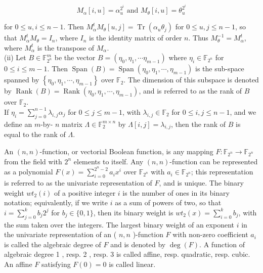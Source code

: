 \documentclass[10pt]{article}
\begin{document}
\begin{equation*}
M_{\alpha}[i, u]=\alpha_{u}^{2^{i}} \text { and } M_{\theta}[i, u]=\theta_{u}^{2^{i}} \tag{1}
\end{equation*}


for $0 \leq u, i \leq n-1$. Then $M_{\alpha}^{t} M_{\theta}[u, j]=\operatorname{Tr}\left(\alpha_{u} \theta_{j}\right)$ for $0 \leq u, j \leq n-1$, so that $M_{\alpha}^{t} M_{\theta}=I_{n}$, where $I_{n}$ is the identity matrix of order $n$. Thus $M_{\theta}^{-1}=M_{\alpha}^{t}$, where $M_{\alpha}^{t}$ is the transpose of $M_{\alpha}$.\\
(ii) Let $B \in \mathbb{F}_{2^{n}}^{m}$ be the vector $B=\left(\eta_{0}, \eta_{1}, \cdots \eta_{m-1}\right)$ where $\eta_{i} \in \mathbb{F}_{2^{n}}$ for $0 \leq i \leq m-1$. Then $\operatorname{Span}(B)=\operatorname{Span}\left(\eta_{0}, \eta_{1}, \cdots, \eta_{m-1}\right)$ is the sub-space spanned by $\left\{\eta_{0}, \eta_{1}, \cdots, \eta_{m-1}\right\}$ over $\mathbb{F}_{2}$. The dimension of this subspace is denoted by $\operatorname{Rank}(B)=\operatorname{Rank}\left(\eta_{0}, \eta_{1}, \cdots, \eta_{m-1}\right)$, and is referred to as the rank of $B$ over $\mathbb{F}_{2}$.\\
If $\eta_{i}=\sum_{j=0}^{n-1} \lambda_{i, j} \alpha_{j}$ for $0 \leq j \leq m-1$, with $\lambda_{i, j} \in \mathbb{F}_{2}$ for $0 \leq i, j \leq n-1$, and we define an $m$-by- $n$ matrix $\Lambda \in \mathbb{F}_{2}^{m \times n}$ by $\Lambda[i, j]=\lambda_{i, j}$, then the rank of $B$ is equal to the rank of $\Lambda$.

An $(n, n)$-function, or vectorial Boolean function, is any mapping $F: \mathbb{F}_{2^{n}} \rightarrow \mathbb{F}_{2^{n}}$ from the field with $2^{n}$ elements to itself. Any $(n, n)$-function can be represented as a polynomial $F(x)=\sum_{i=0}^{2^{n}-2} a_{i} x^{i}$ over $\mathbb{F}_{2^{n}}$ with $a_{i} \in \mathbb{F}_{2^{n}}$; this representation is referred to as the univariate representation of $F$, and is unique. The binary weight $w t_{2}(i)$ of a positive integer $i$ is the number of ones in its binary notation; equivalently, if we write $i$ as a sum of powers of two, so that $i=\sum_{j=0}^{k} b_{j} 2^{j}$ for $b_{j} \in\{0,1\}$, then its binary weight is $w t_{2}(x)=\sum_{i=0}^{k} b_{j}$, with the sum taken over the integers. The largest binary weight of an exponent $i$ in the univariate representation of an ( $n, n$ )-function $F$ with non-zero coefficient $a_{i}$ is called the algebraic degree of $F$ and is denoted by $\operatorname{deg}(F)$. A function of algebraic degree 1 , resp. 2 , resp. 3 is called affine, resp. quadratic, resp. cubic. An affine $F$ satisfying $F(0)=0$ is called linear.
\end{document}
